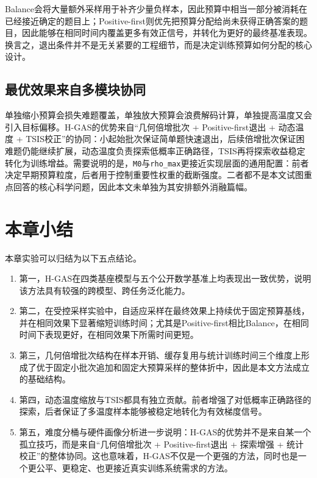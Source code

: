 Balance会将大量额外采样用于补齐少量负样本，因此预算中相当一部分被消耗在已经接近确定的题目上；Positive-first则优先把预算分配给尚未获得正确答案的题目，因此能够在相同时间内覆盖更多有效正信号，并转化为更好的最终基准表现。换言之，退出条件并不是无关紧要的工程细节，而是决定训练预算如何分配的核心设计。

\subsection{最优效果来自多模块协同}
\label{subsec:exp_discussion_synergy}

单独缩小预算会损失难题覆盖，单独放大预算会浪费解码计算，单独提高温度又会引入目标偏移。H-GAS的优势来自“几何倍增批次 + Positive-first退出 + 动态温度 + TSIS校正”的协同：小起始批次保证简单题快速退出，后续倍增批次保证困难题仍能继续扩展，动态温度负责探索低概率正确路径，TSIS再将探索收益稳定转化为训练增益。需要说明的是，\texttt{M0}与\texttt{rho\_max}更接近实现层面的通用配置：前者决定早期预算粒度，后者用于控制重要性权重的截断强度。二者都不是本文试图重点回答的核心科学问题，因此本文未单独为其安排额外消融篇幅。

\section{本章小结}
\label{sec:exp_summary}

本章实验可以归结为以下五点结论。

\begin{enumerate}
    \item 第一，H-GAS在四类基座模型与五个公开数学基准上均表现出一致优势，说明该方法具有较强的跨模型、跨任务泛化能力。
    \item 第二，在受控采样实验中，自适应采样在最终效果上持续优于固定预算基线，并在相同效果下显著缩短训练时间；尤其是Positive-first相比Balance，在相同时间下表现更好，在相同效果下所需时间更短。
    \item 第三，几何倍增批次结构在样本开销、缓存复用与统计训练时间三个维度上形成了优于固定小批次追加和固定大预算采样的整体折中，因此是本文方法成立的基础结构。
    \item 第四，动态温度缩放与TSIS都具有独立贡献。前者增强了对低概率正确路径的探索，后者保证了多温度样本能够被稳定地转化为有效梯度信号。
    \item 第五，难度分桶与硬件画像分析进一步说明：H-GAS的优势并不是来自某一个孤立技巧，而是来自“几何倍增批次 + Positive-first退出 + 探索增强 + 统计校正”的整体协同。这也意味着，H-GAS不仅是一个更强的方法，同时也是一个更公平、更稳定、也更接近真实训练系统需求的方法。
\end{enumerate}

